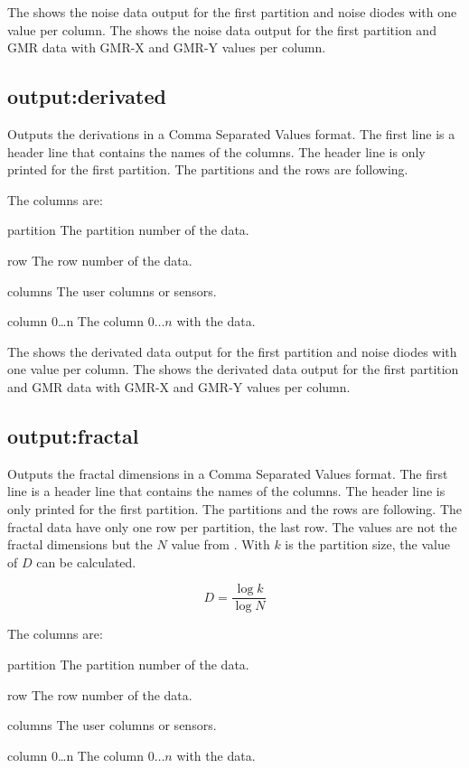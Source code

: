 The  shows the noise data output for the
first partition and noise diodes with one value per column.
The  shows the noise data output for the
first partition and GMR data with GMR-X and GMR-Y values per column.

\subsection{output:derivated}

Outputs the derivations in a Comma Separated Values format. The first line is
a header line that contains the names of the columns.
The header line is only printed for the first partition.
The partitions and the
rows are following.

The columns are:
\begin{asparadesc}
\item[partition]
The partition number of the data.
\item[row]
The row number of the data.
\item[columns]
The user columns or sensors.
\item[column 0\dots{n}]
The column $0\dots{n}$ with the data.
\end{asparadesc}

The  shows the derivated data output for the
first partition and noise diodes with one value per column.
The  shows the derivated data output for the
first partition and GMR data with GMR-X and GMR-Y values per column.

\subsection{output:fractal}

Outputs the fractal dimensions in a Comma Separated Values format. The first line is
a header line that contains the names of the columns.
The header line is only printed for the first partition.
The partitions and the
rows are following. The fractal data have only one row per partition, the last
row. The values are not the fractal dimensions but the $N$ value from
. With $k$ is the partition size, the value of $D$
can be calculated.

\begin{equation}\label{eq:fractal_dimension}
D=\frac{\log{k}}{\log{N}}
\end{equation}


The columns are:
\begin{asparadesc}
\item[partition]
The partition number of the data.
\item[row]
The row number of the data.
\item[columns]
The user columns or sensors.
\item[column 0\dots{n}]
The column $0\dots{n}$ with the data.
\end{asparadesc}

